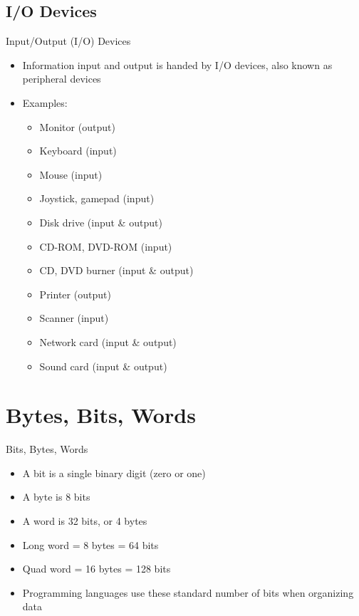 \documentclass[graphics]{beamer}
\begin{document}
\subsection{I/O Devices}
\begin{frame}{Input/Output (I/O) Devices}
    \begin{itemize}
        \item Information input and output is handed by I/O devices, also known as peripheral devices
        \item Examples:
        \begin{itemize}
            \item Monitor (output)
            \item Keyboard (input)
            \item Mouse (input)
            \item Joystick, gamepad (input)
            \item Disk drive (input \& output)
            \item CD-ROM, DVD-ROM (input)
            \item CD, DVD burner (input \& output)
            \item Printer (output)
            \item Scanner (input)
            \item Network card (input \& output)
            \item Sound card (input \& output)
        \end{itemize}
    \end{itemize}
\end{frame}

\section{Bytes, Bits, Words}
\begin{frame}{Bits, Bytes, Words}
    \begin{itemize}
        \item A bit is a single binary digit (zero or one)
        \item A byte is 8 bits
        \item A word is 32 bits, or 4 bytes
        \item Long word = 8 bytes = 64 bits
        \item Quad word = 16 bytes = 128 bits
        \item Programming languages use these standard number of bits when organizing data
    \end{itemize}
\end{frame}
\end{document}
